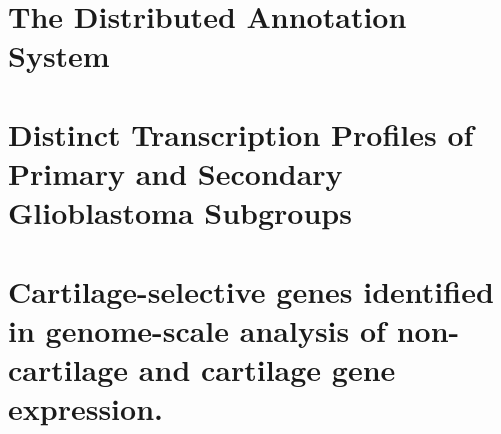 \documentclass [PhD] {uclathes}
\begin{document}
\chapter{The Distributed Annotation System}


\chapter{Distinct Transcription Profiles of Primary and Secondary Glioblastoma
Subgroups}

\chapter{Cartilage-selective genes identified in genome-scale analysis of
non-cartilage and cartilage gene expression.}



\end{document}
